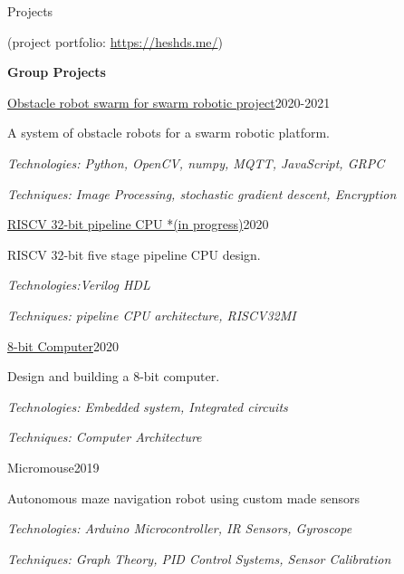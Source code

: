 \documentclass{resume} %
\begin{document}
\begin{rSection}{Projects}

(project portfolio: \href{https://heshds.me/}{https://heshds.me/})

\textbf{Group Projects}\\

\begin{rSubsection}{\href{https://heshds.me/e16-3yp-obstacle-bots-for-swarm-robots/}{Obstacle robot swarm for swarm robotic project}}{2020-2021}{}{}
\item A system of obstacle robots for a swarm robotic platform. \item 
\textit{Technologies: Python, OpenCV, numpy, MQTT, JavaScript, GRPC}
\item \textit{Techniques: Image Processing, stochastic gradient descent, Encryption }
\end{rSubsection}

\begin{rSubsection}{\href{https://heshds.me/RV32IM-pipeline-implementation/}{RISCV 32-bit pipeline CPU *(in progress)}}{2020}{}{}
\item RISCV 32-bit five stage pipeline CPU design.\item 
\textit{Technologies:Verilog HDL}
\item \textit{Techniques: pipeline CPU architecture, RISCV32MI}
\end{rSubsection}


\begin{rSubsection}{\href{https://github.com/HeshanDissanayake/8-bit-computer}{8-bit Computer}}{2020}{}{}
\item Design and building a 8-bit computer. \item 
\textit{Technologies: Embedded system, Integrated circuits}
\item \textit{Techniques: Computer Architecture }
\end{rSubsection}

\begin{rSubsection}{Micromouse}{2019}{}{}
\item Autonomous maze navigation robot using custom made sensors 
\item \textit{Technologies: Arduino Microcontroller, IR Sensors, Gyroscope} 
\item \textit{Techniques: Graph Theory, PID Control Systems, Sensor Calibration}
\end{rSubsection}

\newpage


\end{rSection}
\end{document}

